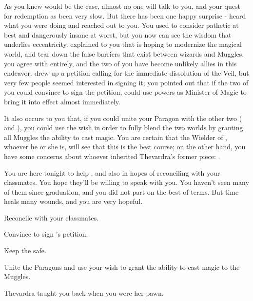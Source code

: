 \documentclass[char]{Katmeers}
\begin{document}
As you knew would be the case, almost no one will talk to you, and your quest for redemption as been very slow. But there has been one happy surprise - \cLuna{} heard what you were doing and reached out to you. You used to consider \cLuna{\them} pathetic at best and dangerously insane at worst, but you now can see the wisdom that underlies \cLuna{\their} eccentricity. \cLuna{} explained to you that \cLuna{\they} is hoping to modernize the magical world, and tear down the false barriers that exist between wizards and Muggles. you agree with \cLuna{\them} entirely, and the two of you have become unlikely allies in this endeavor. \cLuna{} drew up a petition calling for the immediate dissolution of the Veil, but very few people seemed interested in signing it; you pointed out that if the two of you could convince \cRon{} to sign the petition, \cRon{\they} could use \cRon{\their} powers as Minister of Magic to bring it into effect almost immediately.

It also occurs to you that, if you could unite your Paragon with the other two (\iWisdom{} and \iPower{}), you could use the wish in order to fully blend the two worlds by granting all Muggles the ability to cast magic. You are certain that the Wielder of \iWisdom{}, whoever he or she is, will see that this is the best course; on the other hand, you have some concerns about whoever inherited Thevardra's former piece: \iPower{}.

You are here tonight to help \cLuna{}, and also in hopes of reconciling with your classmates. You hope they'll be willing to speak with you. You haven't seen many of them since graduation, and you did not part on the best of terms. But time heals many wounds, and you are very hopeful.

\begin{itemz}[Goals]
	\item Reconcile with your classmates.
	\item Convince \cRon{} to sign \cLuna{}'s petition.
	\item Keep the \iCourage{} safe.
	\item Unite the Paragons and use your wish to grant the ability to cast magic to the Muggles.
\end{itemz}

\begin{itemz}[Notes]
	\item Thevardra taught you \aAK{} back when you were her pawn.
\end{itemz}
\end{document}
